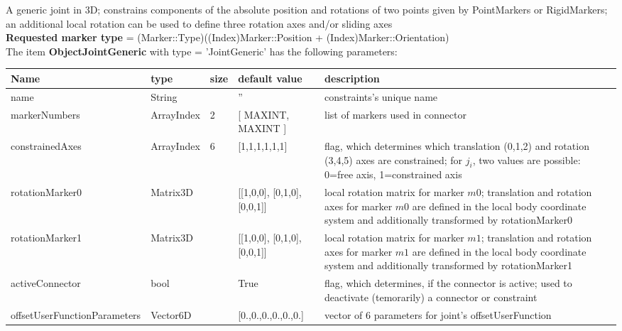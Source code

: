 A generic joint in 3D; constrains components of the absolute position and rotations of two points given by PointMarkers or RigidMarkers; an additional local rotation can be used to define three rotation axes and/or sliding axes
 \\  {\bf Requested marker type} = (Marker::Type)((Index)Marker::Position + (Index)Marker::Orientation) \\ 
\vspace{12pt} \noindent The item {\bf ObjectJointGeneric} with type = 'JointGeneric' has the following parameters:\vspace{-1cm}\\ 
\begin{center}
  \footnotesize
  \begin{longtable}{| p{4.5cm} | p{2.5cm} | p{0.5cm} | p{2.5cm} | p{6cm} |}
    \hline
    \bf Name & \bf type & \bf size & \bf default value & \bf description \\ \hline
    name &     String &      &     '' &     constraints's unique name\\ \hline
    markerNumbers &     ArrayIndex &     2 &     [ MAXINT, MAXINT ] &     list of markers used in connector\\ \hline
    constrainedAxes &     ArrayIndex &     6 &     [1,1,1,1,1,1] &     flag, which determines which translation (0,1,2) and rotation (3,4,5) axes are constrained; for $j_i$, two values are possible: 0=free axis, 1=constrained axis\\ \hline
    rotationMarker0 &     Matrix3D &      &     [[1,0,0], [0,1,0], [0,0,1]] &     local rotation matrix for marker $m0$; translation and rotation axes for marker $m0$ are defined in the local body coordinate system and additionally transformed by rotationMarker0\\ \hline
    rotationMarker1 &     Matrix3D &      &     [[1,0,0], [0,1,0], [0,0,1]] &     local rotation matrix for marker $m1$; translation and rotation axes for marker $m1$ are defined in the local body coordinate system and additionally transformed by rotationMarker1\\ \hline
    activeConnector &     bool &      &     True &     flag, which determines, if the connector is active; used to deactivate (temorarily) a connector or constraint\\ \hline
    offsetUserFunctionParameters &     Vector6D &      &     [0.,0.,0.,0.,0.,0.] &     vector of 6 parameters for joint's offsetUserFunction\\ \hline

\end{longtable}
\end{center}
